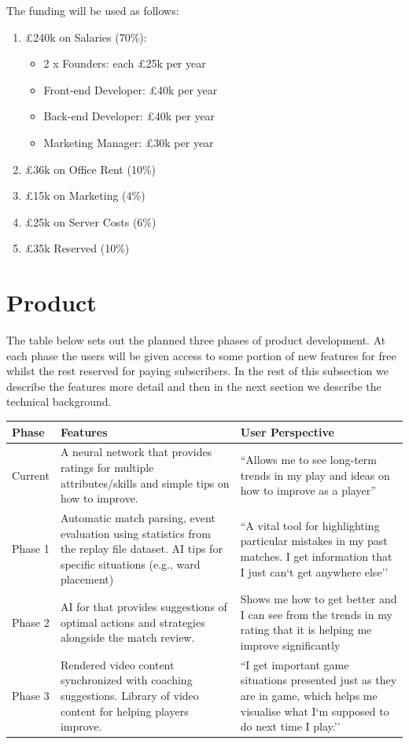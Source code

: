 \documentclass[12pt]{report} %
\begin{document}
The funding will be used as follows:\\
\begin{enumerate}
\item \pounds240k on Salaries (70\%):
\begin{itemize}
\item 2 x Founders: each \pounds25k per year
\item Front-end Developer: \pounds40k per year
\item Back-end Developer: \pounds40k per year
\item Marketing Manager: \pounds30k per year 
\end{itemize}
\item \pounds36k on Office Rent (10\%)
\item \pounds15k on Marketing (4\%)
\item \pounds25k on Server Costs (6\%)
\item \pounds35k Reserved (10\%)
\end{enumerate}

\section{Product}

The table below sets out the planned three phases of product development. At each phase the users will be given access to some portion of new features for free whilst the rest reserved for paying subscribers. In the rest of this subsection we describe the features more detail and then in the next section we describe the technical background.

\begin{center}
    \begin{tabular}{ | l | p{6cm} | p{6cm} |}
    \hline
    Phase & Features  & User Perspective\\ \hline
    Current & A neural network that provides ratings for multiple attributes/skills and simple tips on how to improve.
 &``Allows me to see long-term trends in my play and ideas on how to improve as a player''\\  \hline
    Phase 1 & Automatic match parsing, event evaluation using statistics from the replay file dataset. AI tips for specific situations (e.g., ward placement)
 & ``A vital tool for highlighting particular mistakes in my past matches. I get information that I just can`t get anywhere else'' \\ \hline
    Phase 2 & AI for that provides suggestions of optimal actions and strategies alongside the match review.  & Shows me how to get better and I can see from the trends in my rating that it is helping me improve significantly  \\
    \hline
     Phase 3 & Rendered video content synchronized with coaching suggestions. Library of video content for helping players improve. & ``I get important game situations presented just as they are in game, which helps me visualise what I`m supposed to do next time I play.'' \\
    \hline
    \end{tabular}
\end{center}
\end{document}
